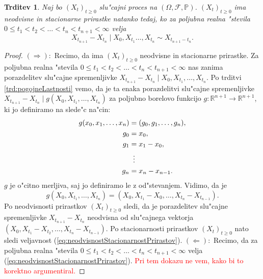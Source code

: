 \documentclass[12pt, a4paper, reqno]{amsart}
\theoremstyle{definition}
\theoremstyle{plain}
\newtheorem{trditev}[definicija]{Trditev}
\newcommand{\R}{\mathbb{R}}
\newcommand{\F}{\mathcal{F}}
\newcommand{\1}{\mathds{1}}
\newcommand*{\refPriloga}[1]{%
  \begingroup
    \hypersetup{
      linkcolor=properpurple,
      linkbordercolor=properpurple,
    }%
    \ref{#1}%
  \endgroup
}
\begin{document}
        \pagebreak
        \begin{trditev}
            Naj bo $(X_t)_{t\geq0}$ slu"cajni proces na $(\Omega, \F, \mathbb{P})$. $(X_t)_{t\geq0}$ ima
            neodvisne in stacionarne prirastke natanko tedaj, ko za poljubna realna "stevila
            $0\leq t_1 < t_2 < \ldots < t_n < t_{n+1} < \infty$ velja 
            \begin{equation}
                X_{t_{n+1}} - X_{t_n}\mid X_{0}, X_{t_1} \dots, X_{t_n} \sim X_{t_{n+1} - t_n}.
                \label{eq:neodvisnostStacionarnostPrirastov}
            \end{equation}
            \label{trd:neodvisnostStacionarnostPrirastov}
        \end{trditev}

        \begin{proof}
            $(\Rightarrow):$ Recimo, da ima $(X_t)_{t\geq0}$ neodvisne in stacionarne prirastke. Za 
            poljubna realna "stevila $0\leq t_1 < t_2 < \ldots < t_n < t_{n+1} < \infty$ nas zanima porazdelitev 
            slu"cajne spremenljivke $X_{t_{n+1}} - X_{t_n}\mid X_{0}, X_{t_1}, \dots, X_{t_n}$.
            Po trditvi \refPriloga{trd:pogojneLastnosti} vemo, da je ta enaka porazdelitvi slu"cajne spremenljivke
            $X_{t_{n+1}} - X_{t_n}\mid g(X_0, X_{t_1}, \dots, X_{t_n})$ za poljubno borelovo funkcijo $g:\R^{n+1}\to \R^{n+1}$,
            ki jo definiramo na slede"c na"cin:
            \begin{align*}
                g(x_0, x_1, \dots, x_n) &= (g_0, g_1, \dots, g_n),\\
                                    g_0 &= x_0, \\
                                    g_1 &= x_1 - x_0, \\
                                    &\mathrel{\makebox[\widthof{=}]{\vdots}} \\
                                    g_n &= x_n - x_{n-1}.
            \end{align*}
            $g$ je o"citno merljiva, saj jo definiramo le z od"stevanjem.
            Vidimo, da je 
            $$g(X_0, X_{t_1}, \dots, X_{t_n}) = (X_0, X_{t_1} - X_0, \dots, X_{t_n} - X_{t_{n-1}}).$$ 
            Po neodvisnosti prirastkov $(X_t)_{t\geq0}$ sledi, da je porazdelitev slu"cajne 
            spremenljivke $X_{t_{n+1}} - X_{t_n}$ neodvisna od slu"cajnega vektorja
            $(X_0, X_{t_1} - X_{t_2}, \dots, X_{t_n} - X_{t_{n-1}})$. Po stacionarnosti prirastkov $(X_t)_{t\geq0}$ nato sledi 
            veljavnost (\ref{eq:neodvisnostStacionarnostPrirastov}). \newline
            \noindent
            $(\Leftarrow):$ Recimo, da za poljubna realna "stevila $0\leq t_1 < t_2 < \ldots < t_n < t_{n+1} < \infty$ velja
            (\ref{eq:neodvisnostStacionarnostPrirastov}).
            \textcolor{red}{Pri tem dokazu ne vem, kako bi to korektno argumentiral.}
        \end{proof}
\end{document}
